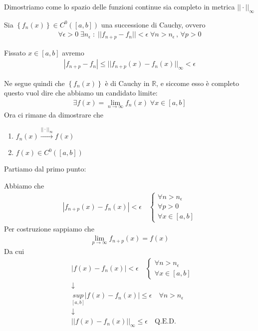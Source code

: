 Dimostriamo come lo spazio delle funzioni continue sia completo in metrica $||\cdot||_\infty$

\bigskip


Sia $\left\{f_n(x)\right\} \in C^0([a,b])$ una successione di Cauchy, ovvero
\begin{align}
\forall \epsilon > 0 \; \exists n_\epsilon \; : \; ||f_{n+p} - f_n||< \epsilon \; \forall n>n_\epsilon \, , \, \forall p>0
\end{align}

Fissato $x\in [a,b]$ avremo
\begin{align}
|f_{n+p} - f_n| \leq || f_{n+p}(x) - f_n(x)||_\infty<\epsilon
\end{align}

Ne segue quindi che $\left\{f_n(x)\right\}$ è di Cauchy in $\mathbb{R}$, e siccome esso è completo questo vuol dire che abbiamo un candidato limite:
\begin{align}
\exists f(x)= \underset{n \rightarrow \infty}{\lim}f_n(x) \; \forall x\in [a,b]
\end{align}
Ora ci rimane da dimostrare che
\begin{enumerate}
	\item $f_n(x) \overset{||\cdot||_\infty}{\longrightarrow} f(x)$
	\item $f(x)  \in C^0([a,b])$
\end{enumerate}

Partiamo dal primo punto:

Abbiamo che
\begin{align}
|f_{n+p}(x) - f_n(x)|< \epsilon \quad \left\{
\begin{array}{ccc}
{}\forall n>n_\epsilon \\
\forall p>0 \\
\forall x \in [a,b]
\end{array}
\right.
\end{align}
Per costruzione sappiamo che
\begin{align}
\underset{p\rightarrow \infty}{\lim}f_{n+p}(x) = f(x)
\end{align}
Da cui
\begin{align}
{}&|f(x) - f_n(x)|< \epsilon \quad \left\{
\begin{array}{cc}
{}\forall n>n_\epsilon \\
\forall x \in [a,b]
\end{array}
\right. \\
&\downarrow \nonumber\\
&\underset{[a,b]}{sup}|f(x) - f_n(x)| \leq \epsilon \quad \forall n> n_\epsilon \\
&\downarrow \nonumber\\
& ||f(x) - f_n(x)||_\infty \leq \epsilon \quad \text{Q.E.D.}
\end{align}

